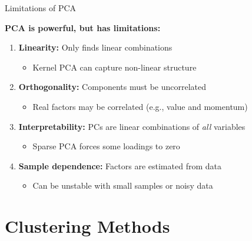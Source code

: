 \documentclass[10pt]{beamer}
\newcommand{\highlight}[1]{\textcolor{AccentOrange}{\textbf{#1}}}
\begin{document}
\begin{frame}{Limitations of PCA}

  \highlight{PCA is powerful, but has limitations:}

  \vspace{1em}
  \begin{enumerate}
    \item \textbf{Linearity:} Only finds linear combinations
    \begin{itemize}
      \item Kernel PCA can capture non-linear structure
    \end{itemize}

    \vspace{0.5em}
    \item \textbf{Orthogonality:} Components must be uncorrelated
    \begin{itemize}
      \item Real factors may be correlated (e.g., value and momentum)
    \end{itemize}

    \vspace{0.5em}
    \item \textbf{Interpretability:} PCs are linear combinations of \emph{all} variables
    \begin{itemize}
      \item Sparse PCA forces some loadings to zero
    \end{itemize}

    \vspace{0.5em}
    \item \textbf{Sample dependence:} Factors are estimated from data
    \begin{itemize}
      \item Can be unstable with small samples or noisy data
    \end{itemize}
  \end{enumerate}
\end{frame}

\section{Clustering Methods}
\end{document}
